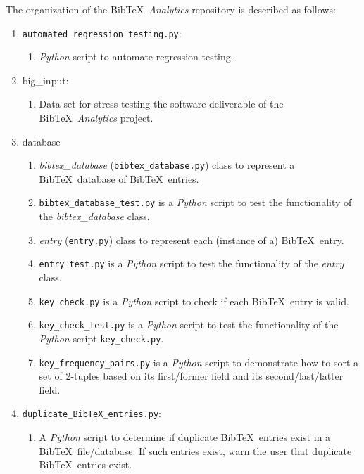 The organization of the {\sc Bib}\TeX\ {\it Analytics} repository is described as follows: \vspace{-0.3cm}
\begin{enumerate} \itemsep -4pt
\item {\tt automated\_regression\_testing.py}: \vspace{-0.3cm}
	\begin{enumerate} \itemsep -2pt
	\item {\it Python} script to automate regression testing.
	\end{enumerate}
\item big\_input: \vspace{-0.3cm}
	\begin{enumerate} \itemsep -2pt
	\item Data set for stress testing the software deliverable of the {\sc Bib}\TeX\ {\it Analytics} project.
	\end{enumerate}
\item database \vspace{-0.3cm}
	\begin{enumerate} \itemsep -2pt
	\item {\it bibtex\_database} ({\tt bibtex\_database.py}) class to represent a {\sc Bib}\TeX\ database of {\sc Bib}\TeX\ entries.
	\item {\tt bibtex\_database\_test.py} is a {\it Python} script to test the functionality of the {\it bibtex\_database} class.
	\item {\it entry} ({\tt entry.py}) class to represent each (instance of a) {\sc Bib}\TeX\ entry.
	\item {\tt entry\_test.py} is a {\it Python} script to test the functionality of the {\it entry} class.
	\item {\tt key\_check.py} is a {\it Python} script to check if each {\sc Bib}\TeX\ entry is valid.
	\item {\tt key\_check\_test.py} is a {\it Python} script to test the functionality of the {\it Python} script {\tt key\_check.py}.
	\item {\tt key\_frequency\_pairs.py} is a {\it Python} script to demonstrate how to sort a set of 2-tuples based on its first/former field and its second/last/latter field.
	\end{enumerate}
\item {\tt duplicate\_BibTeX\_entries.py}: \vspace{-0.3cm}
	\begin{enumerate} \itemsep -2pt
	\item A {\it Python} script to determine if duplicate {\sc Bib}\TeX\ entries exist in a {\sc Bib}\TeX\ file/database. If such entries exist, warn the user that duplicate {\sc Bib}\TeX\ entries exist. 

\end{enumerate}
\end{enumerate}

